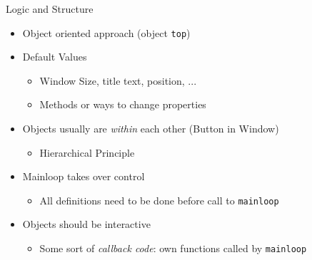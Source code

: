\begin{frame}{Logic and Structure}
%
\begin{itemize}
\item Object oriented approach (object \texttt{top})
\item Default Values
	\begin{itemize}
	\item Window Size, title text, position, ...
	\item[\Thus] Methods or ways to change properties
	\end{itemize}
\item Objects usually are \emph{within} each other (Button in Window)
	\begin{itemize}
	\item[\Thus] Hierarchical Principle
	\end{itemize}
\item Mainloop takes over control
	\begin{itemize}
	\item[\Thus] All definitions need to be done before call to \texttt{mainloop}
	\end{itemize}
\item Objects should be interactive
	\begin{itemize}
	\item[\Thus] Some sort of \emph{callback code}: own functions called by \texttt{mainloop}
	\end{itemize}
\end{itemize}
%
\end{frame}


